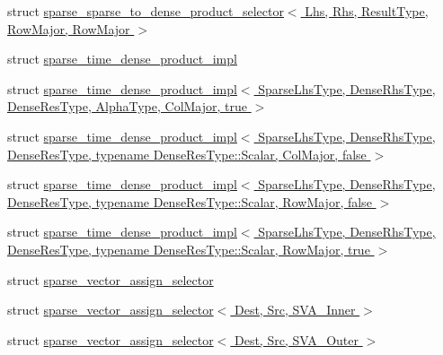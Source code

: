 \begin{DoxyCompactItemize}
\item 
struct \hyperlink{struct_eigen_1_1internal_1_1sparse__sparse__to__dense__product__selector_3_01_lhs_00_01_rhs_00_01573c79e134c90f065c2aee6c07fd478}{sparse\+\_\+sparse\+\_\+to\+\_\+dense\+\_\+product\+\_\+selector$<$ Lhs, Rhs, Result\+Type, Row\+Major, Row\+Major $>$}
\item 
struct \hyperlink{struct_eigen_1_1internal_1_1sparse__time__dense__product__impl}{sparse\+\_\+time\+\_\+dense\+\_\+product\+\_\+impl}
\item 
struct \hyperlink{struct_eigen_1_1internal_1_1sparse__time__dense__product__impl_3_01_sparse_lhs_type_00_01_dense_4902bcccfe44923f57955b34ebedf211}{sparse\+\_\+time\+\_\+dense\+\_\+product\+\_\+impl$<$ Sparse\+Lhs\+Type, Dense\+Rhs\+Type, Dense\+Res\+Type, Alpha\+Type, Col\+Major, true $>$}
\item 
struct \hyperlink{struct_eigen_1_1internal_1_1sparse__time__dense__product__impl_3_01_sparse_lhs_type_00_01_dense_67299fc86a44049a87b7e209695d23ff}{sparse\+\_\+time\+\_\+dense\+\_\+product\+\_\+impl$<$ Sparse\+Lhs\+Type, Dense\+Rhs\+Type, Dense\+Res\+Type, typename Dense\+Res\+Type\+::\+Scalar, Col\+Major, false $>$}
\item 
struct \hyperlink{struct_eigen_1_1internal_1_1sparse__time__dense__product__impl_3_01_sparse_lhs_type_00_01_dense_14133348dce4820dcfa39d8f4e0ae837}{sparse\+\_\+time\+\_\+dense\+\_\+product\+\_\+impl$<$ Sparse\+Lhs\+Type, Dense\+Rhs\+Type, Dense\+Res\+Type, typename Dense\+Res\+Type\+::\+Scalar, Row\+Major, false $>$}
\item 
struct \hyperlink{struct_eigen_1_1internal_1_1sparse__time__dense__product__impl_3_01_sparse_lhs_type_00_01_dense_b414480199bc806c66dca70961af5e2d}{sparse\+\_\+time\+\_\+dense\+\_\+product\+\_\+impl$<$ Sparse\+Lhs\+Type, Dense\+Rhs\+Type, Dense\+Res\+Type, typename Dense\+Res\+Type\+::\+Scalar, Row\+Major, true $>$}
\item 
struct \hyperlink{struct_eigen_1_1internal_1_1sparse__vector__assign__selector}{sparse\+\_\+vector\+\_\+assign\+\_\+selector}
\item 
struct \hyperlink{struct_eigen_1_1internal_1_1sparse__vector__assign__selector_3_01_dest_00_01_src_00_01_s_v_a___inner_01_4}{sparse\+\_\+vector\+\_\+assign\+\_\+selector$<$ Dest, Src, S\+V\+A\+\_\+\+Inner $>$}
\item 
struct \hyperlink{struct_eigen_1_1internal_1_1sparse__vector__assign__selector_3_01_dest_00_01_src_00_01_s_v_a___outer_01_4}{sparse\+\_\+vector\+\_\+assign\+\_\+selector$<$ Dest, Src, S\+V\+A\+\_\+\+Outer $>$}

\end{DoxyCompactItemize}
